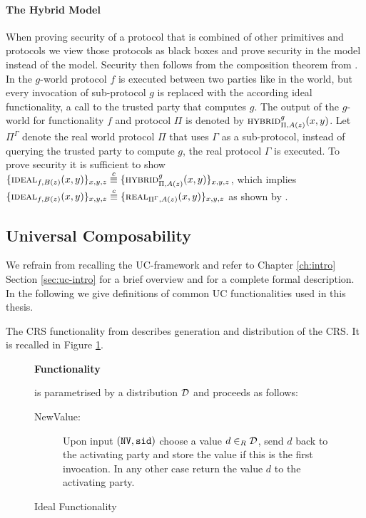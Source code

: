 \paragraph{The Hybrid Model}
When proving security of a protocol that is combined of other primitives and protocols we view those protocols as black boxes and prove security in the \HYBRID model instead of the \REAL model.
Security then follows from the composition theorem from \citet{Canetti00}.
In the $g$-\HYBRID world protocol $f$ is executed between two parties like in the \REAL world, but every invocation of sub-protocol $g$ is replaced with the according ideal functionality, \ie a call to the trusted party that computes $g$.
The output of the $g$-\HYBRID world for functionality $f$ and protocol $\Pi$ is denoted by $\HYBRID_{\Pi, A(z)}^{g} (x, y)$.
Let $\Pi^\Gamma$ denote the real world protocol $\Pi$ that uses $\Gamma$ as a sub-protocol, \ie instead of querying the trusted party to compute $g$, the real protocol $\Gamma$ is executed.
To prove security it is sufficient to show 
$\{\IDEAL_{f, B(z)}(x, y)\}_{x, y, z} \stackrel{c}{\equiv} \{\HYBRID_{\Pi, A(z)}^{g} (x, y)\}_{x, y, z}$,
which implies
$\{\IDEAL_{f, B(z)}(x, y)\}_{x, y, z} \stackrel{c}{\equiv} \{\REAL_{\Pi^{\Gamma}, A(z)} (x, y)\}_{x, y, z}$
as shown by \citet{Canetti00}.

\subsection{Universal Composability} \label{sec:uc-prelims}
We refrain from recalling the \ac{UC}-framework and refer to Chapter \ref{ch:intro} Section \ref{sec:uc-intro} for a brief overview and \citet{Canetti2001a} for a complete formal description.
In the following we give definitions of common \ac{UC} functionalities used in this thesis.

The \ac{CRS} functionality from \citet{CanettiF01} describes generation and distribution of the \ac{CRS}.
It is recalled in Figure \ref{fig:crsfunctionality}.

\begin{figure}[h!]
\begin{mdframed}[innertopmargin=10pt]
\begin{center}
{\bf Functionality \Fcrs}
\end{center}
\Fcrs is parametrised by a distribution $\mathcal{D}$ and proceeds as follows:

\begin{description}
	
	\item[NewValue:] Upon input $(\mathtt{NV}, \mathtt{sid})$ choose a value $d\in_R\mathcal{D}$, send $d$ back to the activating party and store the value if this is the first invocation.
	  In any other case return the value $d$ to the activating party.
	
\end{description}
\end{mdframed}
\caption{Ideal Functionality \Fcrs}
\label{fig:crsfunctionality}
\end{figure}

